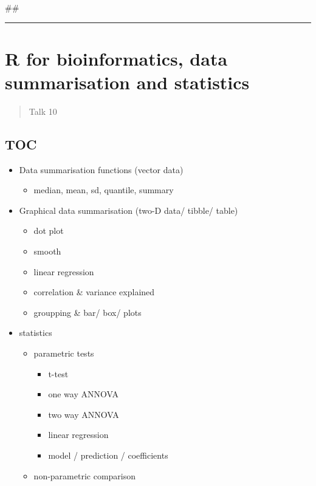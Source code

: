 \documentclass[
]{article}
\begin{document}
\#\#

\begin{center}\rule{0.5\linewidth}{0.5pt}\end{center}

\newpage
\hypertarget{r-for-bioinformatics-data-summarisation-and-statistics}{%
\section{R for bioinformatics, data summarisation and
statistics}\label{r-for-bioinformatics-data-summarisation-and-statistics}}

\begin{quote}
Talk 10
\end{quote}

\hypertarget{toc-2}{%
\subsection{TOC}\label{toc-2}}

\begin{itemize}
\item
  Data summarisation functions (vector data)

  \begin{itemize}
  \item
    median, mean, sd, quantile, summary
  \end{itemize}
\item
  Graphical data summarisation (two-D data/ tibble/ table)

  \begin{itemize}
  \item
    dot plot
  \item
    smooth
  \item
    linear regression
  \item
    correlation \& variance explained
  \item
    groupping \& bar/ box/ plots
  \end{itemize}
\item
  statistics

  \begin{itemize}
  \item
    parametric tests

    \begin{itemize}
    \item
      t-test
    \item
      one way ANNOVA
    \item
      two way ANNOVA
    \item
      linear regression
    \item
      model / prediction / coefficients
    \end{itemize}
  \item
    non-parametric comparison
  \end{itemize}
\end{itemize}
\end{document}
